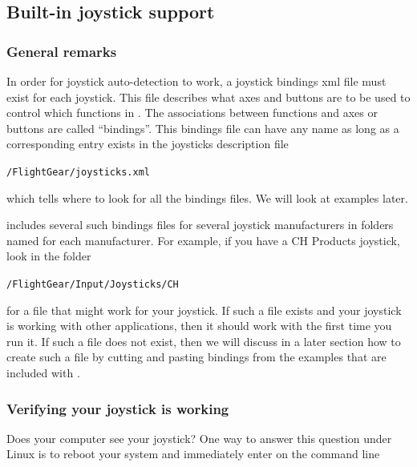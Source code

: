 \subsection{Built-in joystick support\label{joystickbuiltin}}

\subsubsection{General remarks\label{generalremarks}}
In order for joystick auto-detection to work, a joystick bindings xml file
must exist for each joystick. This file describes what axes and buttons are
to be used to control which functions in \FlightGear{}.  The associations
between functions and axes or buttons are called ``bindings''.  This
bindings file can have any name as long as a corresponding entry exists in
the joysticks description file
\medskip

     	\texttt{/FlightGear/joysticks.xml} 
\medskip

\noindent
which tells \FlightGear{} where to look for all the bindings files.  We will
look at examples later.

\FlightGear{} includes several such bindings files for several joystick
manufacturers in folders named for each manufacturer.  For example, if you
have a CH Products joystick, look in the folder
\medskip

    \texttt{/FlightGear/Input/Joysticks/CH}
    \medskip
    
\noindent
for a file that might work for your joystick.  If such a file exists and
your joystick is working with other applications, then it should work with
\FlightGear{} the first time you run it.  If such a file does not exist,
then we will discuss in a later section how to create such a file by cutting
and pasting bindings from the examples that are included with \FlightGear{}.

\subsubsection{Verifying your joystick is working\label{verifying}}
Does your computer see your joystick?  One way to answer this question under Linux is to reboot your system and immediately enter on the command line
\medskip

